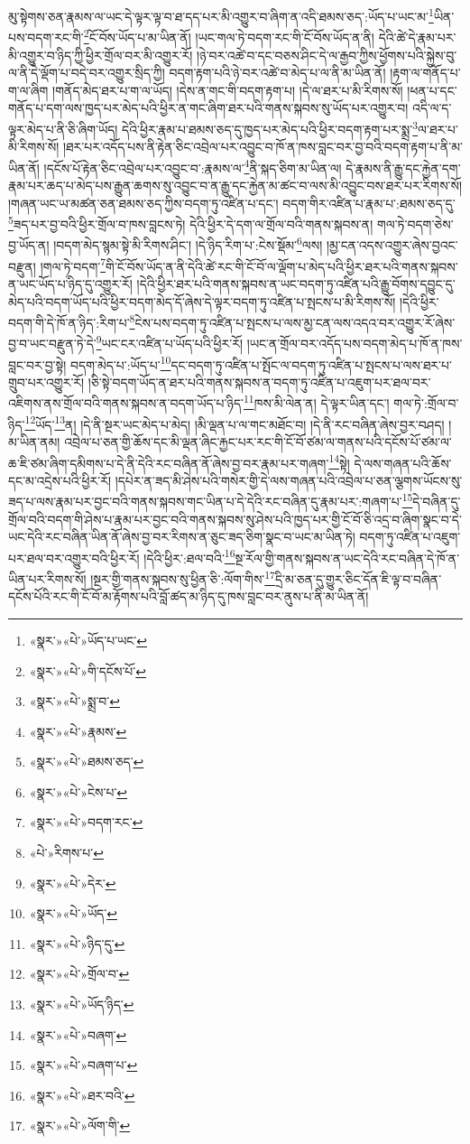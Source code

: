 མུ་སྟེགས་ཅན་རྣམས་ལ་ཡང་དེ་ལྟར་ལྟ་བ་ཐ་དད་པར་མི་འགྱུར་བ་ཞིག་ན་འདི་ཐམས་ཅད་:ཡོད་པ་ཡང་མ་\footnote{«སྣར་»«པེ་»ཡོད་པ་ཡང་}ཡིན་པས་བདག་རང་གི་\footnote{«སྣར་»«པེ་»གི་དངོས་པོ་}ངོ་བོས་ཡོད་པ་མ་ཡིན་ནོ། །ཡང་གལ་ཏེ་བདག་རང་གི་ངོ་བོས་ཡོད་ན་ནི། དེའི་ཚེ་དེ་རྣམ་པར་མི་འགྱུར་བ་ཉིད་ཀྱི་ཕྱིར་གྲོལ་བར་མི་འགྱུར་རོ། །ཉེ་བར་འཚེ་བ་དང་བཅས་ཤིང་དེ་ལ་རྒྱབ་ཀྱིས་ཕྱོགས་པའི་སྐྱེས་བུ་ལ་ནི་དེ་ལྡོག་པ་བདེ་བར་འགྱུར་སྲིད་ཀྱི། བདག་རྟག་པའི་ཉེ་བར་འཚེ་བ་མེད་པ་ལ་ནི་མ་ཡིན་ནོ། །རྟག་ལ་གནོད་པ་ག་ལ་ཞིག །གནོད་མེད་ཐར་པ་ག་ལ་ཡོད། །དེས་ན་གང་གི་བདག་རྟག་པ། །དེ་ལ་ཐར་པ་མི་རིགས་སོ། །ཕན་པ་དང་གནོད་པ་དག་ལས་ཁྱད་པར་མེད་པའི་ཕྱིར་ན་གང་ཞིག་ཐར་པའི་གནས་སྐབས་སུ་ཡོད་པར་འགྱུར་བ། འདི་ལ་ད་ལྟར་མེད་པ་ནི་ཅི་ཞིག་ཡོད། དེའི་ཕྱིར་རྣམ་པ་ཐམས་ཅད་དུ་ཁྱད་པར་མེད་པའི་ཕྱིར་བདག་རྟག་པར་སྨྲ་\footnote{«སྣར་»«པེ་»སྨྲ་བ་}ལ་ཐར་པ་མི་རིགས་སོ། །ཐར་པར་འདོད་པས་ནི་རྟེན་ཅིང་འབྲེལ་པར་འབྱུང་བ་ཁོ་ན་ཁས་བླང་བར་བྱ་བའི་བདག་རྟག་པ་ནི་མ་ཡིན་ནོ། །དངོས་པོ་རྟེན་ཅིང་འབྲེལ་པར་འབྱུང་བ་:རྣམས་ལ་\footnote{«སྣར་»«པེ་»རྣམས་}ནི་སྐད་ཅིག་མ་ཡིན་ལ། དེ་རྣམས་ནི་རྒྱུ་དང་རྐྱེན་དག་རྣམ་པར་ཆད་པ་མེད་པས་རྒྱུན་ཆགས་སུ་འབྱུང་བ་ན་རྒྱུ་དང་རྐྱེན་མ་ཚང་བ་ལས་མི་འབྱུང་བས་ཐར་པར་རིགས་སོ། །གཞན་ཡང་ཡ་མཚན་ཅན་ཐམས་ཅད་ཀྱིས་བདག་ཏུ་འཛིན་པ་དང་། བདག་གིར་འཛིན་པ་རྣམ་པ་:ཐམས་ཅད་དུ་\footnote{«སྣར་»«པེ་»ཐམས་ཅད་}ཟད་པར་བྱ་བའི་ཕྱིར་གྲོལ་བ་ཁས་བླངས་ཏེ། དེའི་ཕྱིར་དེ་དག་ལ་གྲོལ་བའི་གནས་སྐབས་ན། གལ་ཏེ་བདག་ཅེས་བྱ་ཡོད་ན། །བདག་མེད་སྙམ་སྟེ་མི་རིགས་ཤིང་། །དེ་ཉིད་རིག་པ་:ངེས་སྡོམ་\footnote{«སྣར་»«པེ་»ངེས་པ་}ལས། །མྱ་ངན་འདས་འགྱུར་ཞེས་བྱའང་བརྫུན། །གལ་ཏེ་བདག་\footnote{«སྣར་»«པེ་»བདག་རང་}གི་ངོ་བོས་ཡོད་ན་ནི་དེའི་ཚེ་རང་གི་ངོ་བོ་ལ་ལྡོག་པ་མེད་པའི་ཕྱིར་ཐར་པའི་གནས་སྐབས་ན་ཡང་ཡོད་པ་ཉིད་དུ་འགྱུར་རོ། །དེའི་ཕྱིར་ཐར་པའི་གནས་སྐབས་ན་ཡང་བདག་ཏུ་འཛིན་པའི་རྒྱུ་བོགས་དབྱུང་དུ་མེད་པའི་བདག་ཡོད་པའི་ཕྱིར་བདག་མེད་དོ་ཞེས་དེ་ལྟར་བདག་ཏུ་འཛིན་པ་སྤངས་པ་མི་རིགས་སོ། །དེའི་ཕྱིར་བདག་གི་དེ་ཁོ་ན་ཉིད་:རིག་པ་\footnote{«པེ་»རིགས་པ་}ངེས་པས་བདག་ཏུ་འཛིན་པ་སྤངས་པ་ལས་མྱ་ངན་ལས་འདའ་བར་འགྱུར་རོ་ཞེས་བྱ་བ་ཡང་བརྫུན་ཏེ་དེ་\footnote{«སྣར་»«པེ་»དེར་}ཡང་ངར་འཛིན་པ་ཡོད་པའི་ཕྱིར་རོ། །ཡང་ན་གྲོལ་བར་འདོད་པས་བདག་མེད་པ་ཁོ་ན་ཁས་བླང་བར་བྱ་སྟེ། བདག་མེད་པ་:ཡོད་པ་\footnote{«སྣར་»«པེ་»ཡོད་}དང་བདག་ཏུ་འཛིན་པ་སྤོང་ལ་བདག་ཏུ་འཛིན་པ་སྤངས་པ་ལས་ཐར་པ་གྲུབ་པར་འགྱུར་རོ། །ཅི་སྟེ་བདག་ཡོད་ན་ཐར་པའི་གནས་སྐབས་ན་བདག་ཏུ་འཛིན་པ་འཇུག་པར་ཐལ་བར་འཇིགས་ནས་གྲོལ་བའི་གནས་སྐབས་ན་བདག་ཡོད་པ་ཉིད་\footnote{«སྣར་»«པེ་»ཉིད་དུ་}ཁས་མི་ལེན་ན། དེ་ལྟར་ཡིན་དང་། གལ་ཏེ་:གྲོལ་བ་ཉིད་\footnote{«སྣར་»«པེ་»གྲོལ་བ་}ཡོད་\footnote{«སྣར་»«པེ་»ཡོད་ཉིད་}ན། །དེ་ནི་སྔར་ཡང་མེད་པ་མེད། །མི་ལྡན་པ་ལ་གང་མཐོང་བ། །དེ་ནི་རང་བཞིན་ཞེས་བྱར་བཤད། །མ་ཡིན་ནམ། འབྲེལ་པ་ཅན་གྱི་ཆོས་དང་མི་ལྡན་ཞིང་རྐྱང་པར་རང་གི་ངོ་བོ་ཙམ་ལ་གནས་པའི་དངོས་པོ་ཙམ་ལ་ཆ་ཇི་ཙམ་ཞིག་དམིགས་པ་དེ་ནི་དེའི་རང་བཞིན་ནོ་ཞེས་བྱ་བར་རྣམ་པར་གཞག་\footnote{«སྣར་»«པེ་»བཞག་}སྟེ། དེ་ལས་གཞན་པའི་ཆོས་དང་མ་འདྲེས་པའི་ཕྱིར་རོ། །དཔེར་ན་ཟད་མི་ཤེས་པའི་གསེར་གྱི་དེ་ལས་གཞན་པའི་འབྲེལ་པ་ཅན་ལྕགས་ཡོངས་སུ་ཟད་པ་ལས་རྣམ་པར་བྱང་བའི་གནས་སྐབས་གང་ཡིན་པ་དེ་དེའི་རང་བཞིན་དུ་རྣམ་པར་:གཞག་པ་\footnote{«སྣར་»«པེ་»བཞག་པ་}དེ་བཞིན་དུ་གྲོལ་བའི་བདག་གི་ཤེས་པ་རྣམ་པར་བྱང་བའི་གནས་སྐབས་སུ་ཤེས་པའི་ཁྱད་པར་གྱི་ངོ་བོ་ཅི་འདྲ་བ་ཞིག་སྣང་བ་དེ་ཡང་དེའི་རང་བཞིན་ཡིན་ནོ་ཞེས་བྱ་བར་རིགས་ན་ཅུང་ཟད་ཅིག་སྣང་བ་ཡང་མ་ཡིན་ཏེ། བདག་ཏུ་འཛིན་པ་འཇུག་པར་ཐལ་བར་འགྱུར་བའི་ཕྱིར་རོ། །དེའི་ཕྱིར་:ཐལ་བའི་\footnote{«སྣར་»«པེ་»ཐར་བའི་}སྔ་རོལ་གྱི་གནས་སྐབས་ན་ཡང་དེའི་རང་བཞིན་དེ་ཁོ་ན་ཡིན་པར་རིགས་སོ། །སྔར་གྱི་གནས་སྐབས་སུ་ཕྱིན་ཅི་:ལོག་གིས་\footnote{«སྣར་»«པེ་»ལོག་གི་}དྲི་མ་ཅན་དུ་གྱུར་ཅིང་དོན་ཇི་ལྟ་བ་བཞིན་དངོས་པོའི་རང་གི་ངོ་བོ་མ་རྟོགས་པའི་བློ་ཚད་མ་ཉིད་དུ་ཁས་བླང་བར་ནུས་པ་ནི་མ་ཡིན་ནོ། 